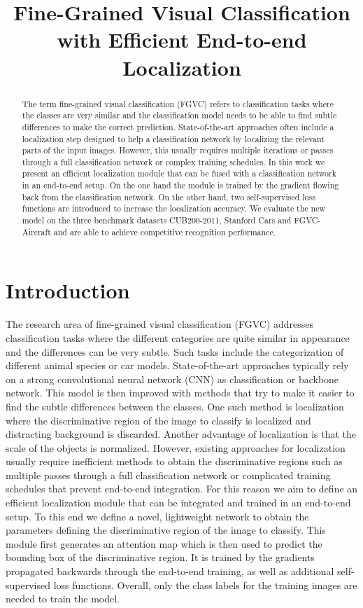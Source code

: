 \documentclass{bmvc2k}
\title{Fine-Grained Visual Classification with Efficient End-to-end Localization}
\begin{document}
\maketitle

\begin{abstract}
The term fine-grained visual classification (FGVC) refers to classification tasks where the classes are very similar and the classification model needs to be able to find subtle differences to make the correct prediction. State-of-the-art approaches often include a localization step designed to help a classification network by localizing the relevant parts of the input images. However, this usually requires multiple iterations or passes through a full classification network or complex training schedules. In this work we present an efficient localization module that can be fused with a classification network in an end-to-end setup. On the one hand the module is trained by the gradient flowing back from the classification network. On the other hand, two self-supervised loss functions are introduced to increase the localization accuracy. We evaluate the new model on the three benchmark datasets CUB200-2011, Stanford Cars and FGVC-Aircraft and are able to achieve competitive recognition performance.
\end{abstract}
\section{Introduction}
The research area of fine-grained visual classification (FGVC) addresses classification tasks where the different categories are quite similar in appearance and the differences can be very subtle. Such tasks include the categorization of different animal species or car models. State-of-the-art approaches typically rely on a strong convolutional neural network (CNN) as classification or backbone network. This model is then improved with methods that try to make it easier to find the subtle differences between the classes. One such method is localization where the discriminative region of the image to classify is localized and distracting background is discarded. Another advantage of localization is that the scale of the objects is normalized. However, existing approaches for localization usually require inefficient methods to obtain the discriminative regions such as multiple passes through a full classification network or complicated training schedules that prevent end-to-end integration. For this reason we aim to define an efficient localization module that can be integrated and trained in an end-to-end setup. To this end we define a novel, lightweight network to obtain the parameters defining the discriminative region of the image to classify. This module first generates an attention map which is then used to predict the bounding box of the discriminative region. It is trained by the gradients propagated backwards through the end-to-end training, as well as additional self-supervised loss functions. Overall, only the class labels for the training images are needed to train the model.
\end{document}

